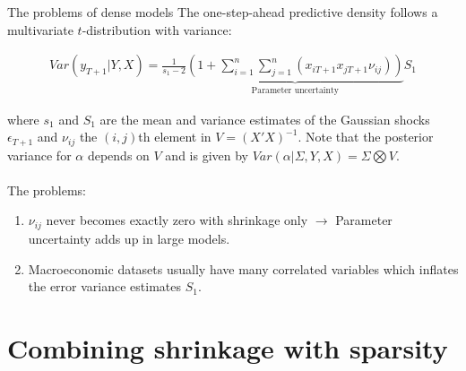 \begin{frame}{The problems of dense models}
    The one-step-ahead predictive density follows a multivariate $t$-distribution with variance:
    
    \begin{align}
        Var(y_{T + 1}|Y,X) = \frac{1}{s_1 - 2} \underbrace{\left(1 + \sum_{i = 1}^{n} \sum_{j = 1}^{n} (x_{iT+1} x_{jT+1} \nu_{ij}) \right)}_{\text{Parameter uncertainty}} S_1
    \end{align}
    
    where $s_1$ and $S_1$ are the mean and variance estimates of the Gaussian shocks $\epsilon_{T + 1}$ and $\nu_{ij}$ the $(i,j)$th element in $V = (X' X)^{-1}$. Note that the posterior variance for $\alpha$ depends on $V$ and is given by $Var(\alpha | \Sigma,Y,X) = \Sigma \bigotimes V$.\\~\\
    
    The problems:
    \begin{enumerate}
        \item $\nu_{ij}$ never becomes exactly zero with shrinkage only $\rightarrow$ Parameter uncertainty adds up in large models.
        \item Macroeconomic datasets usually have many correlated variables which inflates the error variance estimates $S_1$.
    \end{enumerate}
\end{frame}

\section{Combining shrinkage with sparsity}

